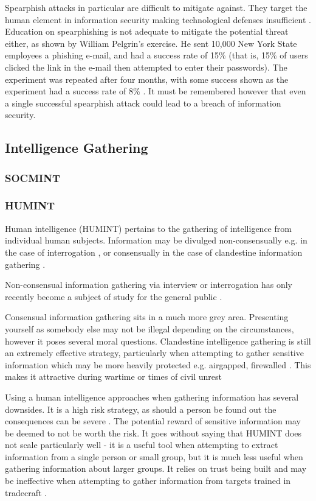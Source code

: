 \documentclass{article}
\begin{document}
Spearphish attacks in particular are difficult to mitigate against. They target the human element in information security making technological defenses insufficient \citep{spearphishing}. Education on spearphishing is not adequate to mitigate the potential threat either, as shown by William Pelgrin's exercise. He sent 10,000 New York State employees a phishing e-mail, and had a success rate of 15\% (that is, 15\% of users clicked the link in the e-mail then attempted to enter their passwords). The experiment was repeated after four months, with some success shown as the experiment had a success rate of 8\% \citep{spearphishingresults}. It must be remembered however that even a single successful spearphish attack could lead to a breach of information security.

\subsection{Intelligence Gathering}
\subsubsection{SOCMINT}
\subsubsection{HUMINT}
Human intelligence (HUMINT) pertains to the gathering of intelligence from individual human subjects. Information may be divulged non-consensually e.g. in the case of interrogation \citep{criminalvshumint}, or consensually in the case of clandestine information gathering \citep{clandestinehumint}. 

Non-consensual information gathering via interview or interrogation has only recently become a subject of study for the general public \citep{humintinterrogators}. 

Consensual information gathering sits in a much more grey area. Presenting yourself as somebody else may not be illegal depending on the circumstances, however it poses several moral questions. Clandestine intelligence gathering is still an extremely effective strategy, particularly when attempting to gather sensitive information which may be more heavily protected e.g. airgapped, firewalled \citep{clandestinehumint}. This makes it attractive during wartime or times of civil unrest \citep{humintni}\citep{humintcyberage}

Using a human intelligence approaches when gathering information has several downsides. It is a high risk strategy, as should a person be found out the consequences can be severe \citep{humintni}. The potential reward of sensitive information may be deemed to not be worth the risk. It goes without saying that HUMINT does not scale particularly well - it is a useful tool when attempting to extract information from a single person or small group, but it is much less useful when gathering information about larger groups. It relies on trust being built and may be ineffective when attempting to gather information from targets trained in tradecraft \citep{humintni}\citep{clandestinehumint}\citep{humintcyberage}.
\end{document}
